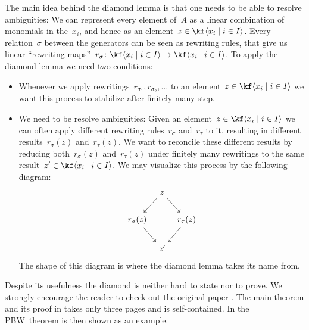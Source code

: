 \begin{remark}
  The main idea behind the diamond lemma is that one needs to be able to resolve ambiguities:
  We can represent every element of~$A$ as a linear combination of monomials in the~$x_i$, and hence as an element~$z \in \kf\gen{x_i \suchthat i \in I}$.
  Every relation~$\sigma$ between the generators can be seen as rewriting rules, that give us linear \enquote{rewriting maps}~$r_\sigma \colon \kf\gen{x_i \suchthat i \in I} \to \kf\gen{x_i \suchthat i \in I}$.
  To apply the diamond lemma we need two conditions:
  \begin{itemize}
    \item
      Whenever we apply rewritings~$r_{\sigma_1}, r_{\sigma_2}, \dotsc$ to an element~$z \in \kf\gen{x_i \suchthat i \in I}$ we want this process to stabilize after finitely many step.
    \item
      We need to be resolve ambiguities:
      Given an element~$z \in \kf\gen{x_i \suchthat i \in I}$ we can often apply different rewriting rules~$r_\sigma$ and~$r_\tau$ to it, resulting in different results~$r_\sigma(z)$ and~$r_\tau(z)$.
      We want to reconcile these different results by reducing both~$r_\sigma(z)$ and~$r_\tau(z)$ under finitely many rewritings to the same result~$z' \in \kf\gen{x_i \suchthat i \in I}$.
      We may visualize this process by the following diagram:
      \[
        \begin{tikzcd}[column sep = tiny]
          {}
          &
          z
          \arrow{dl}
          \arrow{dr}
          &
          {}
          \\
          r_\sigma(z)
          \arrow{dr}
          &
          {}
          &
          r_\tau(z)
          \arrow{dl}
          \\
          {}
          &
          z'
          &
          {}
        \end{tikzcd}
      \]
      The shape of this diagram is where the diamond lemma takes its name from.
  \end{itemize}
  
  Despite its usefulness the diamond is neither hard to state nor to prove.
  We strongly encourage the reader to check out the original paper \cite{diamond_lemma}.
  The main theorem and its proof in \cite[\S 1]{diamond_lemma} takes only three pages and is self-contained.
  In \cite[\S 3]{diamond_lemma} the PBW~theorem is then shown as an example.
\end{remark}





